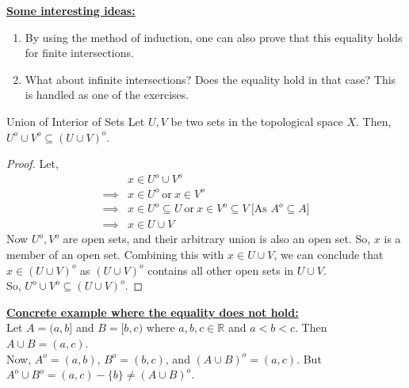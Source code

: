 \noindent\textbf{\underline{Some interesting ideas:}}
\begin{enumerate}
    \item By using the method of induction, one can also prove that this equality holds for finite intersections.
    \item What about infinite intersections? Does the equality hold in that case? This is handled as one of the exercises.
\end{enumerate}
\begin{Theorem}{Union of Interior of Sets}\label{union_interior}
    Let $U, V$ be two sets in the topological space $X$. Then, $  U^o\cup V^o \subseteq (U\cup V)^o $.
\end{Theorem}
\begin{proof}
    Let,
    \begin{align*}
        & x\in  U^o\cup V^o \\
        \implies& x\in U^o\ \text{or}\ x\in V^o\\
        \implies& x\in U^o\subseteq U\ \text{or}\ x\in V^o\subseteq V\ \text{[As $A^o\subseteq A$]}\\
        \implies& x\in U\cup V
    \end{align*}
    Now $U^o, V^o$ are open sets, and their arbitrary union is also an open set. So, $x$ is a member of an open set. Combining this with $x\in U\cup V$, we can conclude that $x\in (U\cup V)^o$ as $(U\cup V)^o$ contains all other open sets in $U\cup V$.\\
    So, $ U^o\cup V^o \subseteq (U\cup V)^o $.
\end{proof}
\noindent\underline{\textbf{Concrete example where the equality does not hold:}}\\
Let $A=(a,b]$ and $B=[b,c)$ where $a, b, c\in\mathbb{R}$ and $a<b<c$. Then $A\cup B=(a,c)$.\\
Now, $A^o=(a,b)$, $B^o=(b,c)$, and $(A\cup B)^o=(a,c)$. But $A^o\cup B^o=(a,c)-\{b\}\neq(A\cup B)^o$.
